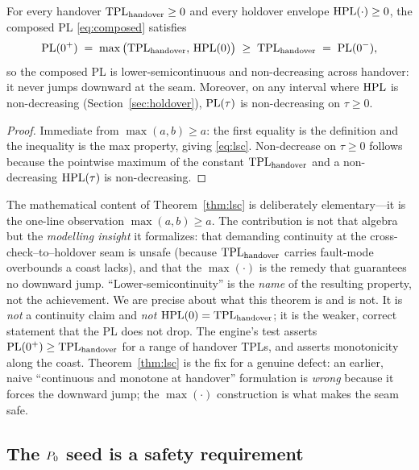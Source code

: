 \begin{theorem}
\label{thm:lsc}
For every handover $\mathrm{TPL}_{\mathrm{handover}}\ge0$ and every holdover envelope
$\mathrm{HPL}(\cdot)\ge0$, the composed PL \eqref{eq:composed} satisfies
\begin{equation}
  \mathrm{PL}(0^{+}) \;=\; \max\big(\mathrm{TPL}_{\mathrm{handover}},\,\mathrm{HPL}(0)\big)
  \;\ge\; \mathrm{TPL}_{\mathrm{handover}} \;=\; \mathrm{PL}(0^{-}),
  \label{eq:lsc}
\end{equation}
so the composed PL is lower-semicontinuous and non-decreasing across handover: it
never jumps downward at the seam. Moreover, on any interval where $\mathrm{HPL}$ is
non-decreasing (Section~\ref{sec:holdover}), $\mathrm{PL}(\tau)$ is non-decreasing on
$\tau\ge0$.
\end{theorem}

\begin{proof}
Immediate from $\max(a,b)\ge a$: the first equality is the definition and the
inequality is the max property, giving \eqref{eq:lsc}. Non-decrease on
$\tau\ge0$ follows because the pointwise maximum of the constant
$\mathrm{TPL}_{\mathrm{handover}}$ and a non-decreasing $\mathrm{HPL}(\tau)$ is non-decreasing.
\end{proof}

The mathematical content of Theorem~\ref{thm:lsc} is deliberately elementary---it is
the one-line observation $\max(a,b)\ge a$. The contribution is not that algebra but
the \emph{modelling insight} it formalizes: that demanding continuity at the
cross-check--to--holdover seam is unsafe (because $\mathrm{TPL}_{\mathrm{handover}}$ carries
fault-mode overbounds a coast lacks), and that the $\max(\cdot)$ is the remedy that
guarantees no downward jump. ``Lower-semicontinuity'' is the \emph{name} of the
resulting property, not the achievement. We are precise about what this theorem is
and is not. It is \emph{not} a continuity claim and \emph{not}
$\mathrm{HPL}(0)=\mathrm{TPL}_{\mathrm{handover}}$; it is the weaker, correct statement that the PL
does not drop. The engine's test
 asserts
$\mathrm{PL}(0^{+})\ge\mathrm{TPL}_{\mathrm{handover}}$ for a range of handover TPLs, and
 asserts monotonicity along
the coast. Theorem~\ref{thm:lsc} is the fix for a genuine defect: an earlier,
naive ``continuous and monotone at handover'' formulation is \emph{wrong} because
it forces the downward jump; the $\max(\cdot)$ construction is what makes the seam
safe.

\subsection{The $P_0$ seed is a safety requirement}
\label{sec:p0safety}

